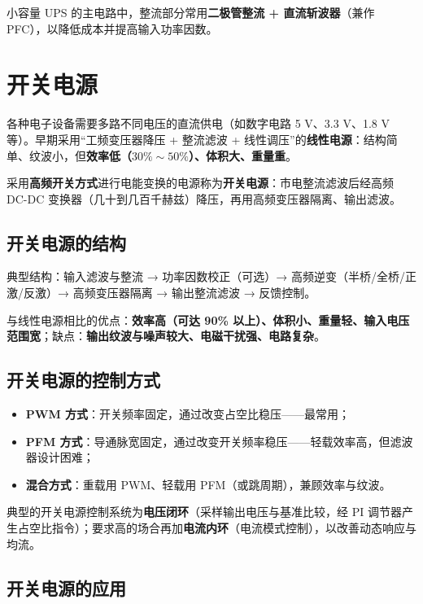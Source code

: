 小容量 UPS 的主电路中，整流部分常用\textbf{二极管整流 + 直流斩波器}（兼作 PFC），以降低成本并提高输入功率因数。

\section{开关电源}

各种电子设备需要多路不同电压的直流供电（如数字电路 5 V、3.3 V、1.8 V 等）。早期采用“工频变压器降压 + 整流滤波 + 线性调压”的\textbf{线性电源}：结构简单、纹波小，但\textbf{效率低（$30\%\sim50\%$）、体积大、重量重}。

采用\textbf{高频开关方式}进行电能变换的电源称为\textbf{开关电源}：市电整流滤波后经高频 DC-DC 变换器（几十到几百千赫兹）降压，再用高频变压器隔离、输出滤波。

\subsection{开关电源的结构}

典型结构：输入滤波与整流 → 功率因数校正（可选）→ 高频逆变（半桥/全桥/正激/反激）→ 高频变压器隔离 → 输出整流滤波 → 反馈控制。

与线性电源相比的优点：\textbf{效率高（可达 90\% 以上）、体积小、重量轻、输入电压范围宽}；缺点：\textbf{输出纹波与噪声较大、电磁干扰强、电路复杂}。

\subsection{开关电源的控制方式}

\begin{itemize}
  \item \textbf{PWM 方式}：开关频率固定，通过改变占空比稳压——最常用；
  \item \textbf{PFM 方式}：导通脉宽固定，通过改变开关频率稳压——轻载效率高，但滤波器设计困难；
  \item \textbf{混合方式}：重载用 PWM、轻载用 PFM（或跳周期），兼顾效率与纹波。
\end{itemize}

典型的开关电源控制系统为\textbf{电压闭环}（采样输出电压与基准比较，经 PI 调节器产生占空比指令）；要求高的场合再加\textbf{电流内环}（电流模式控制），以改善动态响应与均流。

\subsection{开关电源的应用}

